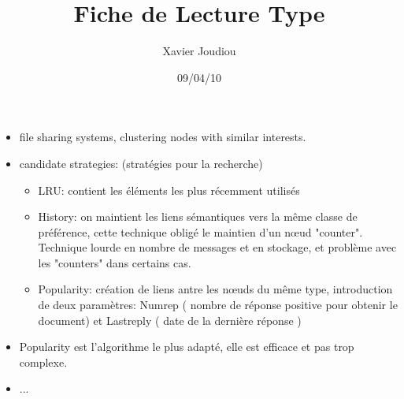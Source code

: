 \documentclass[11pt,a4paper]{article}
\title{Fiche de Lecture Type}
\author{Xavier Joudiou}
\date{09/04/10}
\begin{document}
	
  \begin{itemize}
  \renewcommand{\labelitemi}{$\Rightarrow$}
	\item file sharing systems, clustering nodes with similar interests.
	\item candidate strategies: (stratégies pour la recherche) 
	\begin{itemize}
		\item LRU: contient les éléments les plus récemment utilisés
		\item History: on maintient les liens sémantiques vers la même classe de préférence, cette technique obligé le maintien d'un nœud "counter". Technique lourde en nombre de messages et en stockage, et problème avec les "counters" dans certains cas.  
		\item Popularity: création de liens antre les nœuds du même type, introduction de deux paramètres: Numrep ( nombre de réponse positive pour obtenir le document) et Lastreply ( date de la dernière réponse )
	\end{itemize} 
	\item Popularity est l'algorithme le plus adapté, elle est efficace et pas trop complexe.
	\item ...
  \end{itemize}
\end{document}
